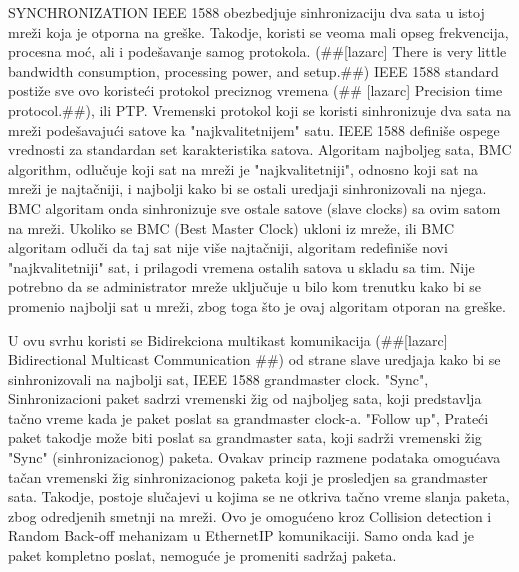 \documentclass[a4paper,12pt, master]{etf}
\begin{document}
	SYNCHRONIZATION
	IEEE 1588 obezbedjuje sinhronizaciju dva sata u istoj mre\v{z}i koja je otporna na gre\v{s}ke. 
	Takodje, koristi se veoma mali opseg frekvencija, procesna mo\'{c}, ali i pode\v{s}avanje samog 
	protokola. (\#\#[lazarc] There is very little bandwidth consumption, processing power, and 
	setup.\#\#) IEEE 1588 standard posti\v{z}e sve ovo koriste\'{c}i protokol preciznog vremena (\#\#
	[lazarc] Precision time protocol.\#\#), ili PTP. Vremenski protokol koji se koristi 
	sinhronizuje dva sata na mre\v{z}i pode\v{s}avaju\'{c}i satove ka "najkvalitetnijem" satu. IEEE 1588 
	defini\v{s}e ospege vrednosti za standardan set karakteristika satova. Algoritam najboljeg 
	sata, BMC algorithm, odlu\v{c}uje koji sat na mre\v{z}i je "najkvalitetniji", odnosno koji sat na 
	mre\v{z}i je najta\v{c}niji, i najbolji kako bi se ostali uredjaji sinhronizovali na njega. BMC 
	algoritam onda sinhronizuje sve ostale satove (slave clocks) sa ovim satom na mre\v{z}i. 
	Ukoliko se BMC (Best Master Clock) ukloni iz mre\v{z}e, ili BMC algoritam odlu\v{c}i da taj sat 
	nije vi\v{s}e najta\v{c}niji, algoritam redefini\v{s}e novi "najkvalitetniji" sat, i prilagodi 
	vremena ostalih satova u skladu sa tim. Nije potrebno da se administrator mre\v{z}e uklju\v{c}uje 
	u bilo kom trenutku kako bi se promenio najbolji sat u mre\v{z}i, zbog toga \v{s}to je ovaj 
	algoritam otporan na gre\v{s}ke.
	
	U ovu svrhu koristi se Bidirekciona multikast komunikacija (\#\#[lazarc] Bidirectional 
	Multicast Communication \#\#) od strane slave uredjaja kako bi se sinhronizovali na 
	najbolji sat, IEEE 1588 grandmaster clock. "Sync", Sinhronizacioni paket sadrzi vremenski 
	\v{z}ig od najboljeg sata, koji predstavlja ta\v{c}no vreme kada je paket poslat sa grandmaster 
	clock-a. "Follow up", Prate\'{c}i paket takodje mo\v{z}e biti poslat sa grandmaster sata, koji 
	sadr\v{z}i vremenski \v{z}ig "Sync" (sinhronizacionog) paketa. Ovakav princip razmene podataka 
	omogu\'{c}ava ta\v{c}an vremenski \v{z}ig sinhronizacionog paketa koji je prosledjen sa grandmaster 
	sata. Takodje, postoje slu\v{c}ajevi u kojima se ne otkriva ta\v{c}no vreme slanja paketa, zbog 
	odredjenih smetnji na mre\v{z}i. Ovo je omogu\'{c}eno kroz Collision detection i Random Back-off 
	mehanizam u Ethernet\/IP komunikaciji. Samo onda kad je paket kompletno poslat, nemogu\'{c}e 
	je promeniti sadr\v{z}aj paketa. 
	
\end{document}
